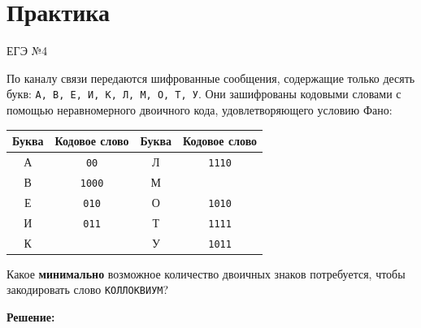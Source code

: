 \documentclass[11pt,a4paper]{article}
\begin{document}
\section{Практика}

\begin{taskbox}{ЕГЭ №4}

По каналу связи передаются шифрованные сообщения, содержащие только десять букв: \texttt{А, В, Е, И, К, Л, М, О, Т, У}. Они зашифрованы кодовыми словами с помощью неравномерного двоичного кода, удовлетворяющего условию Фано:

\begin{center}
\begin{tabular}{|c|c|c|c|}
\hline
\textbf{Буква} & \textbf{Кодовое слово} & \textbf{Буква} & \textbf{Кодовое слово} \\ \hline
А & \texttt{00}   & Л & \texttt{1110} \\ \hline
В & \texttt{1000} & М &               \\ \hline
Е & \texttt{010}  & О & \texttt{1010} \\ \hline
И & \texttt{011}  & Т & \texttt{1111} \\ \hline
К &               & У & \texttt{1011} \\ \hline
\end{tabular}
\end{center}

Какое \textbf{минимально} возможное количество двоичных знаков потребуется, чтобы закодировать слово \texttt{КОЛЛОКВИУМ}?
\end{taskbox}

\textbf{Решение:}
\end{document}
